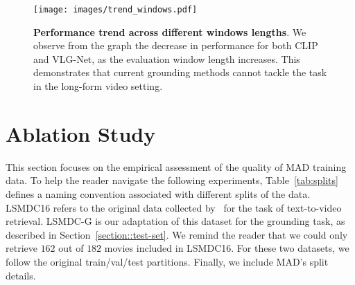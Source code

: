 \documentclass[10pt,twocolumn,letterpaper]{article}
\begin{document}
\begin{figure}[t]
    \centering
        \texttt{[image: images/trend\_windows.pdf]}
        
        \vspace{-0.2cm}
        \caption{\textbf{Performance trend across different windows lengths}. 
         We observe from the graph the decrease in performance for both CLIP and VLG-Net, as the evaluation window length increases. This demonstrates that current grounding methods cannot tackle the task in the long-form video setting. 
        \vspace{-0.3cm}
    }
    \label{fig:trend_windows}
\end{figure}  
\section{Ablation Study}\label{sec:analysis}
This section focuses on the empirical assessment of the quality of MAD training data.
To help the reader navigate the following experiments, Table~\ref{tab:splits} defines a naming convention associated with different splits of the data. LSMDC16 refers to the original data collected  by~\cite{rohrbach2015dataset,torabi2015using,rohrbach2017movie} for the task of text-to-video retrieval. LSMDC-G is our adaptation of this dataset for the grounding task, as described in Section~\ref{section::test-set}. 
We remind the reader that we could only retrieve $162$ out of $182$ movies included in LSMDC16. 
For these two datasets, we follow the original train/val/test partitions. Finally, we include MAD's split details. 
\end{document}
